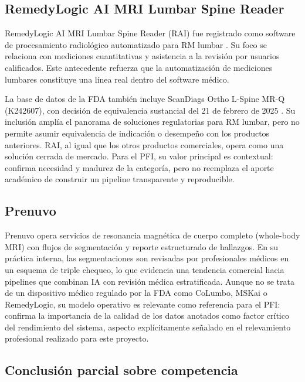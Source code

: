 \subsection{RemedyLogic AI MRI Lumbar Spine Reader}

RemedyLogic AI MRI Lumbar Spine Reader (RAI) fue registrado como software de procesamiento radiológico automatizado para RM lumbar \parencite{fda_remedylogic_2024}. Su foco se relaciona con mediciones cuantitativas y asistencia a la revisión por usuarios calificados. Este antecedente refuerza que la automatización de mediciones lumbares constituye una línea real dentro del software médico.

La base de datos de la FDA también incluye ScanDiags Ortho L-Spine MR-Q (K242607), con decisión de equivalencia sustancial del 21 de febrero de 2025 \parencite{fda_scandiags_2025}. Su inclusión amplía el panorama de soluciones regulatorias para RM lumbar, pero no permite asumir equivalencia de indicación o desempeño con los productos anteriores. RAI, al igual que los otros productos comerciales, opera como una solución cerrada de mercado. Para el PFI, su valor principal es contextual: confirma necesidad y madurez de la categoría, pero no reemplaza el aporte académico de construir un pipeline transparente y reproducible.

\subsection{Prenuvo}

Prenuvo opera servicios de resonancia magnética de cuerpo completo (whole-body MRI) con flujos de segmentación y reporte estructurado de hallazgos. En su práctica interna, las segmentaciones son revisadas por profesionales médicos en un esquema de triple chequeo, lo que evidencia una tendencia comercial hacia pipelines que combinan IA con revisión médica estratificada. Aunque no se trata de un dispositivo médico regulado por la FDA como CoLumbo, MSKai o RemedyLogic, su modelo operativo es relevante como referencia para el PFI: confirma la importancia de la calidad de los datos anotados como factor crítico del rendimiento del sistema, aspecto explícitamente señalado en el relevamiento profesional realizado para este proyecto.

\subsection{Conclusión parcial sobre competencia}

